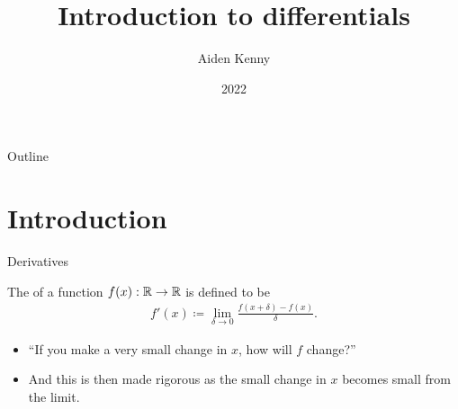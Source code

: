 \documentclass[8pt, aspectratio=149]{beamer}
\begin{document}
    
\title{Introduction to differentials} 
\author{Aiden Kenny} 
\date{2022}

\newcommand{\thel}{t{}h} 
\newcommand{\Jacobian}{J{}a{}c{}o{}b{}i{}a{}n}

\begin{frame}{}

    \maketitle

\end{frame}

\begin{frame}{Outline}

    \tableofcontents

\end{frame}



\section{Introduction} 
\begin{frame}{Derivatives} 

    The  of a function \( f(x) : \mathbb{R} \to \mathbb{R} \) is defined to be 
    \begin{align*}
        f'(x)
        \coloneqq 
        \lim_{\delta \to 0} \frac{f(x + \delta) - f(x)}{\delta}. 
    \end{align*}
    \begin{itemize}
        \item ``If you make a very small change in \( x \), how will \( f \) change?'' 
        \item And this is then made rigorous as the small change in \( x \) becomes small from the limit. 
    \end{itemize}

\end{frame}
\end{document}
